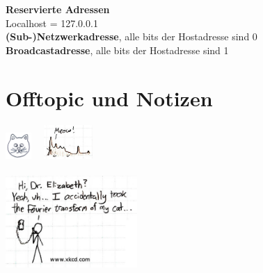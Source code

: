 \documentclass[fs, footer]{latex4ei}
\begin{document}
\begin{multicols*}{4}
{	\textbf{Reservierte Adressen}\\
	Localhost = 127.0.0.1 \\
	\textbf{(Sub-)Netzwerkadresse}, alle bits der Hostadresse sind 0 \\
	\textbf{Broadcastadresse}, alle bits der Hostadresse sind 1  \\
	
}	





\sectionbox{
	\subsection{}

}





\columnbreak


\section{Offtopic und Notizen}
 \qquad \includegraphics[height = 1cm]{./img/cat.jpg} \ \raisebox{0.5cm}{$\FT$}\ \includegraphics[height = 1.3cm]{./img/cat_f.jpg}\\
\\
\includegraphics[width = 5cm]{./img/xkcd2.jpg}



\end{multicols*}
\end{document}

